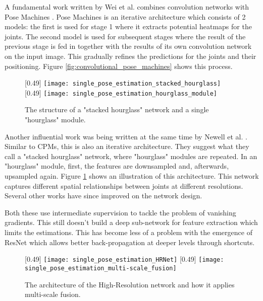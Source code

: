 A fundamental work written by Wei et al. \cite{Wei2016} combines convolution networks with Pose Machines \cite{Ramakrishna2014}.
Pose Machines is an iterative architecture which consists of 2 models: the first is used for stage 1 where it extracts potential heatmaps for the joints.
The second model is used for subsequent stages where the result of the previous stage is fed in together with the results of its own convolution network on the input image. 
This gradually refines the predictions for the joints and their positioning.
Figure \ref{fig:convolutional_pose_machines} shows this process.

\begin{figure}
	\centering
	[0.49\textwidth]{%
		\texttt{[image: single\_pose\_estimation\_stacked\_hourglass]}%
	}
	[0.49\textwidth]{%
		\texttt{[image: single\_pose\_estimation\_hourglass\_module]}%
	}
	\caption{
		The structure of a "stacked hourglass" network and a single "hourglass" module.\cite{Newell2016}
	}
	\label{fig:stacked_hourglass}
\end{figure}

Another influential work was being written at the same time by Newell et al. \cite{Newell2016}.
Similar to \gls{CPMs}, this is also an iterative architecture.
They suggest what they call a "stacked hourglass" network, where "hourglass" modules are repeated.
In an "hourglass" module, first, the features are downsampled and, afterwards, upsampled again.
Figure \ref{fig:stacked_hourglass} shows an illustration of this architecture.
This network captures different spatial relationships between joints at different resolutions.
Several other works \cite{Yang2017, Yu2017, Chou17} have since improved on the network design.

Both these use intermediate supervision to tackle the problem of vanishing gradients.
This still doesn't build a deep sub-network for feature extraction which limits the estimations.
This has become less of a problem with the emergence of \gls{ResNet} \cite{He2015} which allows better back-propagation at deeper levels through shortcuts.

\begin{figure}
	\centering
	[0.49\textwidth]{%
		\texttt{[image: single\_pose\_estimation\_HRNet]}%
	}
	[0.49\textwidth]{%
		\texttt{[image: single\_pose\_estimation\_multi-scale\_fusion]}%
	}
	\caption{
		The architecture of the High-Resolution network and how it applies multi-scale fusion.\cite{Sun2019}
	}
	\label{fig:HRNet}
\end{figure}

